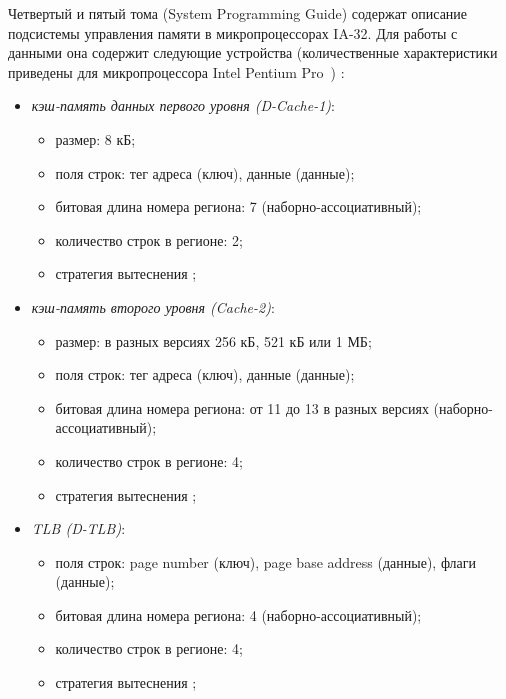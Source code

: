 Четвертый и пятый тома (System Programming Guide) содержат описание подсистемы управления памяти в
микропроцессорах IA-32. Для работы с данными она содержит следующие устройства
(количественные характеристики приведены для микропроцессора Intel Pentium
Pro~\cite{PentiumPro}) :
\begin{itemize}
  \item \emph{кэш-память данных первого уровня (D-Cache-1)}:
        \begin{itemize}
            \item размер: 8 кБ;
            \item поля строк: тег адреса (ключ), данные (данные);
            \item битовая длина номера региона: 7 (наборно-ассоциативный);
            \item количество строк в регионе: 2;
            \item стратегия вытеснения \LRU;
        \end{itemize}

  \item \emph{кэш-память второго уровня (Cache-2)}:
        \begin{itemize}
            \item размер: в разных версиях 256 кБ, 521 кБ или 1 МБ;
            \item поля строк: тег адреса (ключ), данные (данные);
            \item битовая длина номера региона: от 11 до 13 в разных версиях
(наборно-ассоциативный);
            \item количество строк в регионе: 4;
            \item стратегия вытеснения \LRU;
        \end{itemize}

  \item \emph{TLB (D-TLB)}:
        \begin{itemize}
            \item поля строк: page number (ключ), page base address (данные),
флаги (данные);
            \item битовая длина номера региона: 4 (наборно-ассоциативный);
            \item количество строк в регионе: 4;
            \item стратегия вытеснения \LRU;
        \end{itemize}


\end{itemize}
